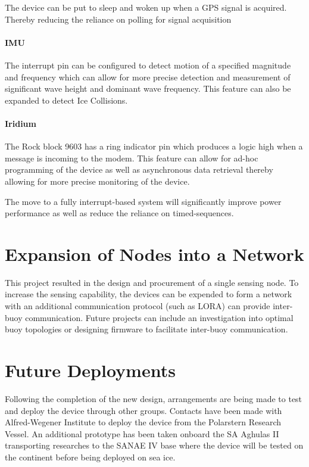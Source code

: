 The device can be put to sleep and woken up when a GPS signal is acquired. Thereby reducing the reliance on polling for signal acquisition

\paragraph{IMU}
The interrupt pin can be configured to detect motion of a specified magnitude and frequency which can allow for more precise detection and measurement of significant wave height and dominant wave frequency. This feature can also be expanded to detect Ice Collisions.

\paragraph{Iridium}

The Rock block 9603 has a ring indicator pin which produces a logic high when a message is incoming to the modem. This feature can allow for ad-hoc programming of the device as well as asynchronous data retrieval thereby allowing for more precise monitoring of the device. 

The move to a fully interrupt-based system will significantly improve power performance as well as reduce the reliance on timed-sequences.

\section{Expansion of Nodes into a Network}

This project resulted in the design and procurement of a single sensing node. To increase the sensing capability, the devices can be expended to form a network with an additional communication protocol (such as LORA) can provide inter-buoy communication. Future projects can include an investigation into optimal buoy topologies or designing firmware to facilitate inter-buoy communication.

\section{Future Deployments}

Following the completion of the new design, arrangements are being made to test and deploy the device through other groups. Contacts have been made with Alfred-Wegener Institute to deploy the device from the Polarstern Research Vessel. An additional prototype has been taken onboard the SA Aghulas II transporting researches to the SANAE IV base where the device will be tested on the continent before being deployed on sea ice.
